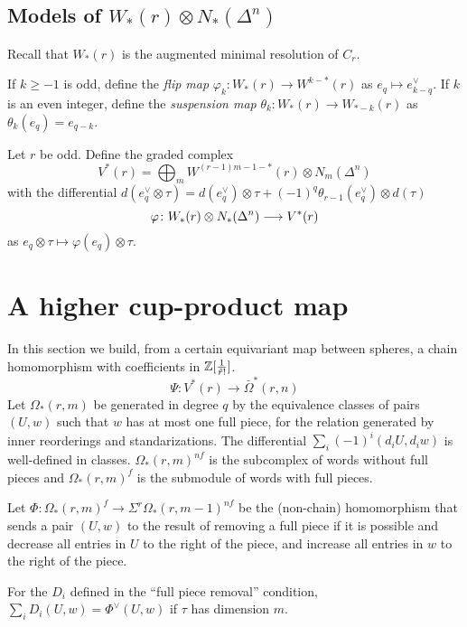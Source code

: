 \subsection{Models of $W_*(r)\otimes N_*(\Delta^n)$}
Recall that $W_*(r)$ is the augmented minimal resolution of $C_r$.
\begin{definition} If $k\geq -1$ is odd, define the \emph{flip map} $\varphi_k\colon W_*(r)\to W^{k-*}(r)$ as $e_q\mapsto e^{\vee}_{k-q}$. If $k$ is an even integer, define the \emph{suspension map} $\theta_k\colon W_*(r)\to W_{*-k}(r)$ as $\theta_k(e_q) = e_{q-k}$.
\end{definition}
Let $r$ be odd. Define the graded complex
\[V^{*}(r) = \bigoplus_{m}W^{(r-1)m-1-*}(r)\otimes N_m(\Delta^n)\]
with the differential $d(e^\vee_q\otimes \tau) = d(e^\vee_q)\otimes \tau + (-1)^q \theta_{r-1}(e^\vee_q)\otimes d(\tau)$%
\[\varphi\colon W_*(r)\otimes N_*(\Delta^n)\longrightarrow V^{*}(r)\]
as $e_{q}\otimes \tau\mapsto \varphi(e_q)\otimes \tau$.

\section{A higher cup-product map}
In this section we build, from a certain equivariant map between spheres, a chain homomorphism with coefficients in $\mathbb{Z}[\frac{1}{\tilde{r}!}]$.
\[\Psi\colon V^*(r)\to \bar{\Omega}^*(r,n)\]
Let $\Omega_*(r,m)$ be generated in degree $q$ by the equivalence classes of pairs $(U,w)$ such that $w$ has at most one full piece, for the relation generated by inner reorderings and standarizations. The differential $\sum_{i} (-1)^i(d_iU,d_iw)$ is well-defined in classes. $\Omega_*(r,m)^{nf}$ is the subcomplex of words without full pieces and $\Omega_*(r,m)^{f}$ is the submodule of words with full pieces.

Let $\Phi\colon \Omega_*(r,m)^f\to \Sigma^{r}\Omega_{*}(r,m-1)^{nf}$ be the (non-chain) homomorphism that sends a pair $(U,w)$ to the result of removing a full piece if it is possible and decrease all entries in $U$ to the right of the piece, and increase all entries in $w$ to the right of the piece.
\begin{remark} For the $D_i$ defined in the ``full piece removal'' condition, $\sum_iD_i(U,w) = \Phi^{\vee}(U,w)$ if $\tau$ has dimension $m$.
\end{remark}


